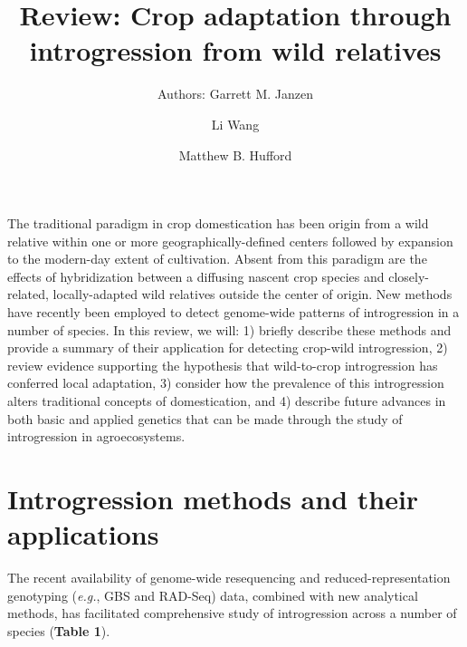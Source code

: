 \documentclass[11pt]{article}
\title{Review: Crop adaptation through introgression from wild relatives}
\author[1]{Authors: Garrett M. Janzen}%
\author[1]{Li Wang}
\author[1,*]{Matthew B. Hufford}
\affil[1]{Department of Ecology, Evolution, and Organismal Biology, Iowa State University, Ames, Iowa, USA}
\affil[*]{Correspondence: mhufford@iastate.edu (M.B. Hufford)}
\date{}
\begin{document}
\maketitle


The traditional paradigm in crop domestication has been origin from a wild relative within one or more geographically-defined centers followed by expansion to the modern-day extent of cultivation.
Absent from this paradigm are the effects of hybridization between a diffusing nascent crop species and closely-related, locally-adapted wild relatives outside the center of origin.
New methods have recently been employed to detect genome-wide patterns of introgression in a number of species.
In this review, we will: 1) briefly describe these methods and provide a summary of their application for detecting crop-wild introgression, 2) review evidence supporting the hypothesis that wild-to-crop introgression has conferred local adaptation, 3) consider how the prevalence of this introgression alters traditional concepts of domestication, and 4) describe future advances in both basic and applied genetics that can be made through the study of introgression in agroecosystems.

\section*{Introgression methods and their applications}

The recent availability of genome-wide resequencing and reduced-representation genotyping (\emph{e.g.}, GBS and RAD-Seq) data, combined with new analytical methods, has facilitated comprehensive study of introgression across a number of species (\textbf{Table 1}).
\end{document}
